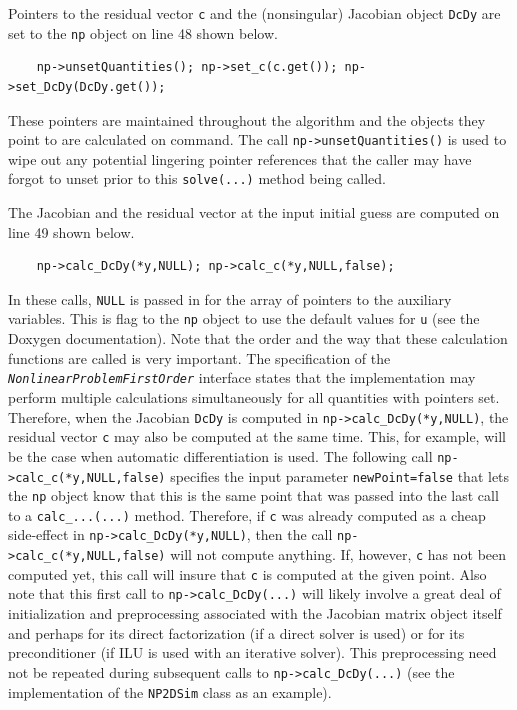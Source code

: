 Pointers to the residual vector \texttt{c} and the (nonsingular)
Jacobian object \texttt{DcDy} are set to the \texttt{np} object on
line 48 shown below.
%
{\scriptsize\begin{verbatim}
    np->unsetQuantities(); np->set_c(c.get()); np->set_DcDy(DcDy.get());
\end{verbatim}}
%
These pointers are maintained throughout the algorithm and the objects
they point to are calculated on command.  The call
\texttt{np->unsetQuantities()} is used to wipe out any potential
lingering pointer references that the caller may have forgot to unset
prior to this \texttt{solve(...)}  method being called.

The Jacobian and the residual vector at the input initial guess
are computed on line 49 shown below.
%
{\scriptsize\begin{verbatim}
    np->calc_DcDy(*y,NULL); np->calc_c(*y,NULL,false);
\end{verbatim}}
%
In these calls, \texttt{NULL} is passed in for the array of pointers to
the auxiliary variables.  This is flag to the \texttt{np} object to
use the default values for \texttt{u} (see the Doxygen documentation).
Note that the order and the way that these calculation functions are
called is very important.  The specification of the
\texttt{\textit{Nonlinear\-Problem\-First\-Order}} interface
states that the implementation may perform multiple calculations
simultaneously for all quantities with pointers set.  Therefore, when
the Jacobian \texttt{DcDy} is computed in
\texttt{np->calc\_DcDy(*y,NULL)}, the residual vector \texttt{c} may
also be computed at the same time.  This, for example, will be the
case when automatic differentiation is used.  The following call
\texttt{np->calc\_c(*y,NULL,false)} specifies the input parameter
\texttt{newPoint=false} that lets the
\texttt{np} object know that this is the same point that was
passed into the last call to a \texttt{calc\_...(...)} method.
Therefore, if \texttt{c} was already computed as a cheap side-effect
in \texttt{np->calc\_DcDy(*y,NULL)}, then the call
\texttt{np->calc\_c(*y,NULL,false)} will not compute anything.  If,
however, \texttt{c} has not been computed yet, this call will insure
that \texttt{c} is computed at the given point.  Also note that this
first call to \texttt{np->calc\_DcDy(...)} will likely involve a great
deal of initialization and preprocessing associated with the Jacobian
matrix object itself and perhaps for its direct factorization (if a
direct solver is used) or for its preconditioner (if ILU is used with
an iterative solver).  This preprocessing need not be repeated during
subsequent calls to \texttt{np->calc\_DcDy(...)} (see the implementation
of the \texttt{NP2DSim} class as an example).

